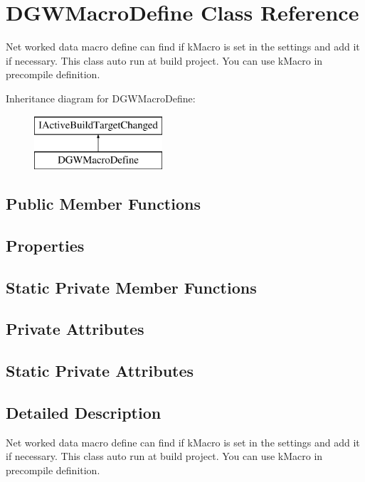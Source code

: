 \hypertarget{classDoxygenGeneratorWindow_1_1DGWMacroDefine}{}\section{D\+G\+W\+Macro\+Define Class Reference}
\label{classDoxygenGeneratorWindow_1_1DGWMacroDefine}


Net worked data macro define can find if k\+Macro is set in the settings and add it if necessary. This class auto run at build project. You can use k\+Macro in precompile definition.  


Inheritance diagram for D\+G\+W\+Macro\+Define\+:\begin{figure}[H]
\begin{center}
\leavevmode
\includegraphics[height=2.000000cm]{d4/d80/classDoxygenGeneratorWindow_1_1DGWMacroDefine}
\end{center}
\end{figure}
\subsection*{Public Member Functions}
\subsection*{Properties}
\subsection*{Static Private Member Functions}
\subsection*{Private Attributes}
\subsection*{Static Private Attributes}


\subsection{Detailed Description}
Net worked data macro define can find if k\+Macro is set in the settings and add it if necessary. This class auto run at build project. You can use k\+Macro in precompile definition. 



